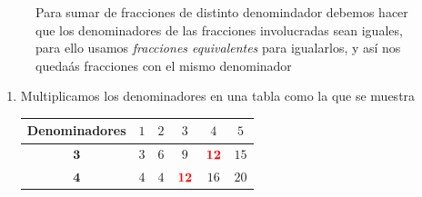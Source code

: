 \documentclass[12pt]{examdesign}
\theoremstyle{plain}
\theoremstyle{definition}
\theoremstyle{remark}
\begin{document}
\begin{endmatter}
		\begin{figure}[!h]
			\begin{minipage}[b]{0.3\textwidth}
				Para sumar de fracciones de distinto denomindador debemos hacer que los denominadores de las fracciones involucradas sean iguales, para ello usamos \textit{fracciones equivalentes} para igualarlos, y así nos quedaás fracciones con el mismo denominador
			\end{minipage}
			\hfill \begin{minipage}[b]{0.65\textwidth}
				\begin{figure}[H]
					\centering
				\end{figure}
			\end{minipage}
		\end{figure}
		\vspace{.4cm}
		\begin{enumerate}
			\item Multiplicamos los denominadores en una tabla como la que se muestra
			
			\begin{center}
				\begin{tabular}{ | c | c | c | c | c | c | }\hline
					\textbf{Denominadores}& $1$ & $2$ & $3$  &          $4$                 & $5$  \\ \hline
					$\textbf{3}$          & $3$ & $6$ & $9$  & ${\color{red}{\textbf{12}}}$ & $15$ \\ \hline
					$\textbf{4}$          & $4$ & $4$ & ${\color{red}{\textbf{12}}}$ & $16$ & $20$ \\ \hline
				\end{tabular}
			\end{center} 
			

\end{enumerate}
\end{endmatter}
\end{document}

